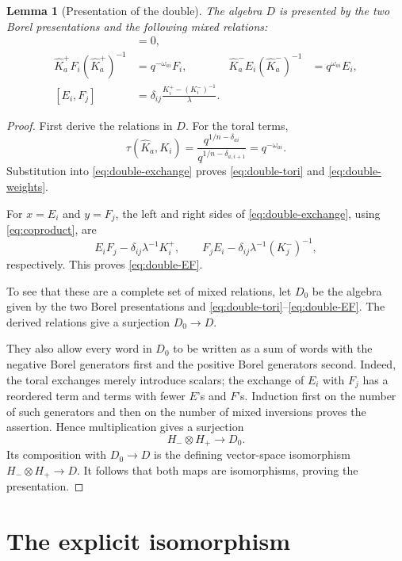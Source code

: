 \documentclass[11pt]{article}
\newtheorem{lemma}[theorem]{Lemma}
\theoremstyle{remark}
\begin{document}
\begin{lemma}[Presentation of the double]\label{lem:double}
The algebra $D$ is presented by the two Borel presentations and
the following mixed relations:
\begin{align}
 [\widehat K_a^+,\widehat K_b^-]&=0,
 \label{eq:double-tori}\\
 \widehat K_a^+F_i(\widehat K_a^+)^{-1}
   &=q^{-\omega_{ai}}F_i,
 &
 \widehat K_a^-E_i(\widehat K_a^-)^{-1}
   &=q^{\omega_{ai}}E_i,
 \label{eq:double-weights}\\
 [E_i,F_j]
   &=\delta_{ij}\frac{K_i^+-(K_i^-)^{-1}}{\lambda}.
 \label{eq:double-EF}
\end{align}
\end{lemma}

\begin{proof}
First derive the relations in $D$.
For the toral terms,
\[
 \tau(\widehat K_a,K_i)
  =\frac{q^{1/n-\delta_{ai}}}
         {q^{1/n-\delta_{a,i+1}}}
  =q^{-\omega_{ai}}.
\]
Substitution into \eqref{eq:double-exchange} proves
\eqref{eq:double-tori} and \eqref{eq:double-weights}.

For $x=E_i$ and $y=F_j$, the left and right sides of
\eqref{eq:double-exchange}, using \eqref{eq:coproduct}, are
\[
 E_iF_j-\delta_{ij}\lambda^{-1}K_i^+,
 \qquad
 F_jE_i-\delta_{ij}\lambda^{-1}(K_j^-)^{-1},
\]
respectively.  This proves \eqref{eq:double-EF}.

To see that these are a complete set of mixed relations, let
$D_0$ be the algebra given by the two Borel presentations and
\eqref{eq:double-tori}--\eqref{eq:double-EF}.  The derived relations
give a surjection $D_0\to D$.

They also allow every word in $D_0$ to be written as a sum of
words with the negative Borel generators first and the positive
Borel generators second.  Indeed, the toral exchanges merely
introduce scalars; the exchange of $E_i$ with $F_j$ has a reordered
term and terms with fewer $E$'s and $F$'s.  Induction first on the
number of such generators and then on the number of mixed
inversions proves the assertion.  Hence multiplication gives a
surjection
\[
 H_-\otimes H_+\longrightarrow D_0.
\]
Its composition with $D_0\to D$ is the defining vector-space
isomorphism $H_-\otimes H_+\to D$.  It follows that both maps are
isomorphisms, proving the presentation.
\end{proof}

\section{The explicit isomorphism}
\end{document}
